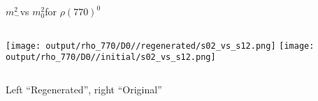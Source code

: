 \documentclass{beamer}
\newcommand{\MM}{\ensuremath{m^2_-}}
\newcommand{\MZ}{\ensuremath{m^2_0}}
\begin{document}
\begin{frame}{\MM vs \MZ for $\rho(770)^0$}
\begin{columns}[t]
\centering
\texttt{[image: output/rho\_770/D0//regenerated/s02\_vs\_s12.png]}
\centering
\texttt{[image: output/rho\_770/D0//initial/s02\_vs\_s12.png]}
\end{columns}
    \centering
    Left ``Regenerated'', right ``Original''
\end{frame} 
\end{document}
